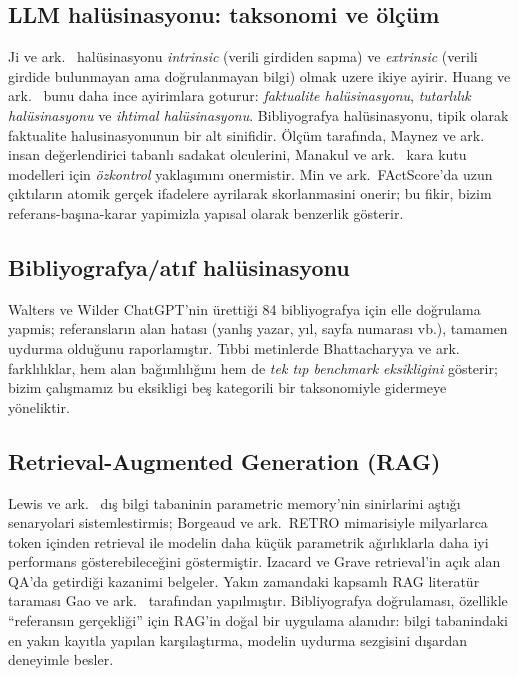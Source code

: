 \documentclass[11pt,a4paper]{article}
\begin{document}
\subsection{LLM halüsinasyonu: taksonomi ve ölçüm}
Ji ve ark.\ \cite{ji2023survey} halüsinasyonu \emph{intrinsic} (verili
girdiden sapma) ve \emph{extrinsic} (verili girdide bulunmayan ama doğrulanmayan
bilgi) olmak uzere ikiye ayirir. Huang ve ark.\ \cite{huang2023hallucination}
bunu daha ince ayirimlara goturur: \emph{faktualite halüsinasyonu},
\emph{tutarlılık halüsinasyonu} ve \emph{ihtimal halüsinasyonu}. Bibliyografya
halüsinasyonu, tipik olarak faktualite halusinasyonunun bir alt sinifidir.
Ölçüm tarafında, Maynez ve ark.\ \cite{maynez2020faithfulness} insan
değerlendirici tabanlı sadakat olculerini, Manakul ve ark.\
\cite{manakul2023selfcheckgpt} kara kutu modelleri için \emph{özkontrol}
yaklaşımını onermistir. Min ve ark.\ FActScore'da \cite{min2023factscore} uzun
çıktıların atomik gerçek ifadelere ayrilarak skorlanmasini onerir; bu fikir,
bizim referans-başına-karar yapimizla yapısal olarak benzerlik gösterir.

\subsection{Bibliyografya/atıf halüsinasyonu}
Walters ve Wilder \cite{walters2023fabrication} ChatGPT'nin ürettiği
84 bibliyografya için elle doğrulama yapmis; referansların %
alan hatası (yanlış yazar, yıl, sayfa numarası vb.), %
tamamen uydurma olduğunu raporlamıştır. Tıbbi metinlerde
Bhattacharyya ve ark.\ \cite{bhattacharyya2023high} %
\cite{athaluri2023exploring} %
farklılıklar, hem alan bağımlılığını hem de \emph{tek tıp benchmark
eksikligini} gösterir; bizim çalışmamız bu eksikligi beş kategorili bir
taksonomiyle gidermeye yöneliktir.

\subsection{Retrieval-Augmented Generation (RAG)}
Lewis ve ark.\ \cite{lewis2020rag} dış bilgi tabaninin parametric memory'nin
sinirlarini aştığı senaryolari sistemlestirmis; Borgeaud ve ark.\ RETRO
mimarisiyle \cite{borgeaud2022retro} milyarlarca token içinden retrieval ile
modelin daha küçük parametrik ağırlıklarla daha iyi performans gösterebileceğini
göstermiştir. Izacard ve Grave \cite{izacard2021leveraging} retrieval'in
açık alan QA'da getirdiği kazanimi belgeler. Yakın zamandaki kapsamlı RAG
literatür taraması Gao ve ark.\ \cite{gao2024ragsurvey} tarafından
yapılmıştır. Bibliyografya doğrulaması, özellikle ``referansın gerçekliği'' için
RAG'in doğal bir uygulama alanıdır: bilgi tabanindaki en yakın kayıtla yapılan
karşılaştırma, modelin uydurma sezgisini dışardan deneyimle besler.
\end{document}
